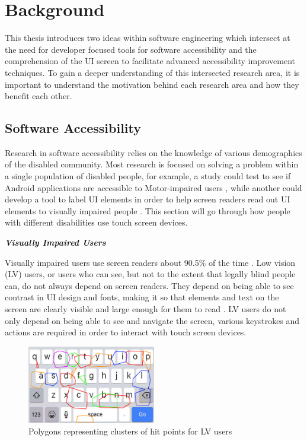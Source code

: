 \section{Background}
\label{sec:background}

This thesis introduces two ideas within software engineering which intersect at the need for developer focused tools for software accessibility and the comprehension of the UI screen to facilitate advanced accessibility improvement techniques. To gain a deeper understanding of this intersected research area, it is important to understand the motivation behind each research area and how they benefit each other. 

\subsection{Software Accessibility}

Research in software accessibility relies on the knowledge of various demographics of the disabled community. Most research is focused on solving a problem within a single population of disabled people, for example, a study could test to see if Android applications are accessible to Motor-impaired users \cite{Alshayban20}, while another could develop a tool to label UI elements in order to help screen readers read out UI elements to visually impaired people \cite{Salehnamadi21}. This section will go through how people with different disabilities use touch screen devices. 

\noindent \textbf{\textit{Visually Impaired Users}}

Visually impaired users use screen readers about 90.5\% of the time \cite{Salehnamadi21}. Low vision (LV) users, or users who can see, but not to the extent that legally blind people can, do not always depend on screen readers. They depend on being able to see contrast in UI design and fonts, making it so that elements and text on the screen are clearly visible and large enough for them to read \cite{IOSDesign}. LV users do not only depend on being able to see and navigate the screen, various keystrokes and actions are required in order to interact with touch screen devices. 

\begin{figure}
    \centering
    \includegraphics[width=0.5\textwidth]{imgs/hits.jpg}
    \caption{Polygons representing clusters of hit points for LV users \cite{4}}
    \label{fig:HitPoint}
\end{figure}

